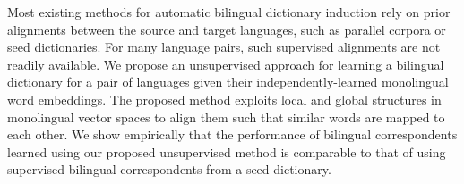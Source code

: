 Most existing methods for automatic bilingual dictionary induction rely on prior alignments between the source and target languages, such as parallel corpora or seed dictionaries. For many language pairs, such supervised alignments are not readily available. We propose an unsupervised approach for learning a bilingual dictionary for a pair of languages given their independently-learned monolingual word embeddings. The proposed method exploits local and global structures in monolingual vector spaces to align them such that similar words are mapped to each other. We show empirically that the performance of bilingual correspondents learned using our proposed unsupervised method is comparable to that of using supervised bilingual correspondents from a seed dictionary.
